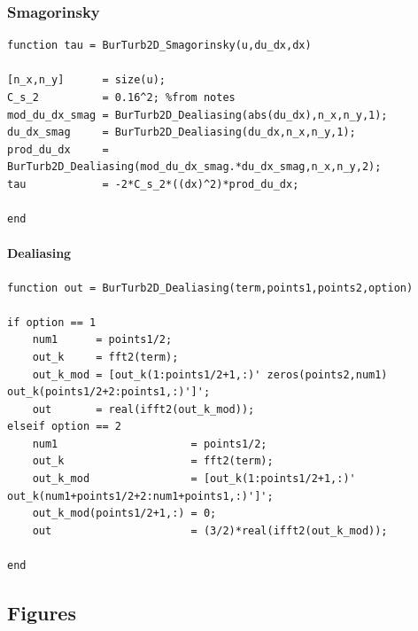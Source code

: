 \documentclass[12pt,twoside]{article}
\begin{document}
\subsubsection{Smagorinsky} \label{sec:smagorinsky}

\begin{lstlisting}
function tau = BurTurb2D_Smagorinsky(u,du_dx,dx)

[n_x,n_y]      = size(u);
C_s_2          = 0.16^2; %from notes
mod_du_dx_smag = BurTurb2D_Dealiasing(abs(du_dx),n_x,n_y,1);
du_dx_smag     = BurTurb2D_Dealiasing(du_dx,n_x,n_y,1);
prod_du_dx     = BurTurb2D_Dealiasing(mod_du_dx_smag.*du_dx_smag,n_x,n_y,2);
tau            = -2*C_s_2*((dx)^2)*prod_du_dx;

end
\end{lstlisting}

\vspace{-30pt}

\paragraph{Dealiasing} \label{sec:dealiasing} \hspace{10pt}

\begin{lstlisting}
function out = BurTurb2D_Dealiasing(term,points1,points2,option)

if option == 1
    num1      = points1/2;
    out_k     = fft2(term);
    out_k_mod = [out_k(1:points1/2+1,:)' zeros(points2,num1) out_k(points1/2+2:points1,:)']';
    out       = real(ifft2(out_k_mod));
elseif option == 2
    num1                     = points1/2;
    out_k                    = fft2(term);
    out_k_mod                = [out_k(1:points1/2+1,:)' out_k(num1+points1/2+2:num1+points1,:)']';
    out_k_mod(points1/2+1,:) = 0;
    out                      = (3/2)*real(ifft2(out_k_mod));
    
end
\end{lstlisting}

\newpage

\subsection{Figures} \label{sec:figures}
\end{document}
